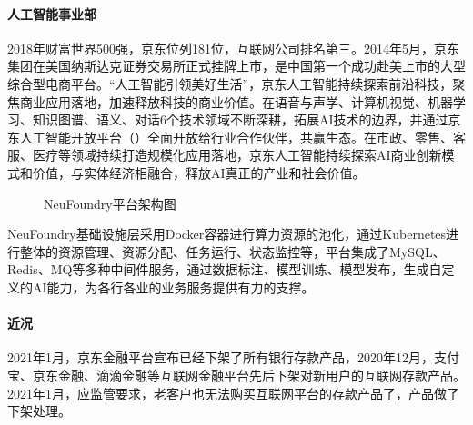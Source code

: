 \documentclass[letterpaper,11pt,english]{sphinxmanual}
\begin{document}


\paragraph{人工智能事业部}
\label{\detokenize{chapter_company/jd:id7}}
2018年财富世界500强，京东位列181位，互联网公司排名第三。2014年5月，京东集团在美国纳斯达克证券交易所正式挂牌上市，是中国第一个成功赴美上市的大型综合型电商平台。“人工智能引领美好生活”，京东人工智能持续探索前沿科技，聚焦商业应用落地，加速释放科技的商业价值。在语音与声学、计算机视觉、机器学习、知识图谱、语义、对话6个技术领域不断深耕，拓展AI技术的边界，并通过京东人工智能开放平台（）全面开放给行业合作伙伴，共赢生态。在市政、零售、客服、医疗等领域持续打造规模化应用落地，京东人工智能持续探索AI商业创新模式和价值，与实体经济相融合，释放AI真正的产业和社会价值。

\begin{figure}[H]
\centering
\capstart

\noindent{}
\caption{NeuFoundry平台架构图}\label{\detokenize{chapter_company/jd:id10}}\end{figure}

NeuFoundry基础设施层采用Docker容器进行算力资源的池化，通过Kubernetes进行整体的资源管理、资源分配、任务运行、状态监控等，平台集成了MySQL、Redis、MQ等多种中间件服务，通过数据标注、模型训练、模型发布，生成自定义的AI能力，为各行各业的业务服务提供有力的支撑。%
\begin{footnote}[902]\sphinxAtStartFootnote
{}
%
\end{footnote}


\paragraph{近况}
\label{\detokenize{chapter_company/jd:id8}}
2021年1月，京东金融平台宣布已经下架了所有银行存款产品，2020年12月，支付宝、京东金融、滴滴金融等互联网金融平台先后下架对新用户的互联网存款产品。2021年1月，应监管要求，老客户也无法购买互联网平台的存款产品了，产品做了下架处理。%
\begin{footnote}[903]\sphinxAtStartFootnote
{}
%
\end{footnote}
\end{document}
